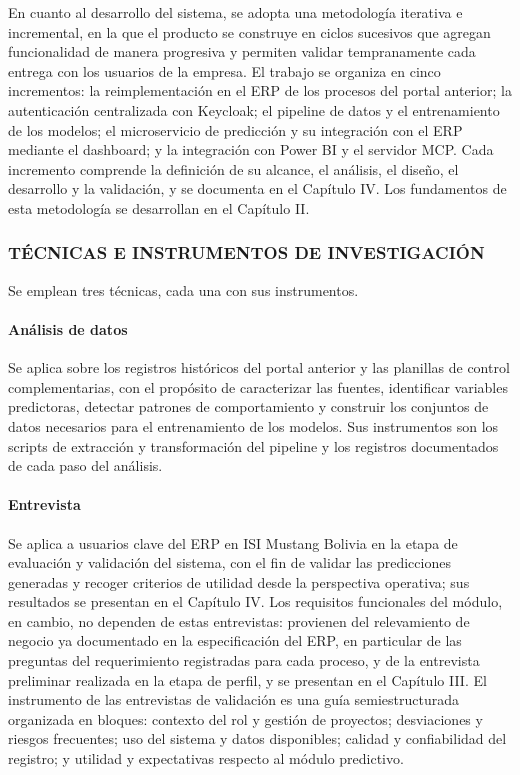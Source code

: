 En cuanto al desarrollo del sistema, se adopta una metodología iterativa e incremental, en la que el producto se construye en ciclos sucesivos que agregan funcionalidad de manera progresiva y permiten validar tempranamente cada entrega con los usuarios de la empresa. El trabajo se organiza en cinco incrementos: la reimplementación en el ERP de los procesos del portal anterior; la autenticación centralizada con Keycloak; el pipeline de datos y el entrenamiento de los modelos; el microservicio de predicción y su integración con el ERP mediante el dashboard; y la integración con Power BI y el servidor MCP. Cada incremento comprende la definición de su alcance, el análisis, el diseño, el desarrollo y la validación, y se documenta en el Capítulo IV. Los fundamentos de esta metodología se desarrollan en el Capítulo II.

\subsubsection{TÉCNICAS E INSTRUMENTOS DE INVESTIGACIÓN}

Se emplean tres técnicas, cada una con sus instrumentos.

\paragraph{Análisis de datos}

Se aplica sobre los registros históricos del portal anterior y las planillas de control complementarias, con el propósito de caracterizar las fuentes, identificar variables predictoras, detectar patrones de comportamiento y construir los conjuntos de datos necesarios para el entrenamiento de los modelos. Sus instrumentos son los scripts de extracción y transformación del pipeline y los registros documentados de cada paso del análisis.

\paragraph{Entrevista}

Se aplica a usuarios clave del ERP en ISI Mustang Bolivia en la etapa de evaluación y validación del sistema, con el fin de validar las predicciones generadas y recoger criterios de utilidad desde la perspectiva operativa; sus resultados se presentan en el Capítulo IV\@. Los requisitos funcionales del módulo, en cambio, no dependen de estas entrevistas: provienen del relevamiento de negocio ya documentado en la especificación del ERP, en particular de las preguntas del requerimiento registradas para cada proceso, y de la entrevista preliminar realizada en la etapa de perfil, y se presentan en el Capítulo III\@. El instrumento de las entrevistas de validación es una guía semiestructurada organizada en bloques: contexto del rol y gestión de proyectos; desviaciones y riesgos frecuentes; uso del sistema y datos disponibles; calidad y confiabilidad del registro; y utilidad y expectativas respecto al módulo predictivo.

